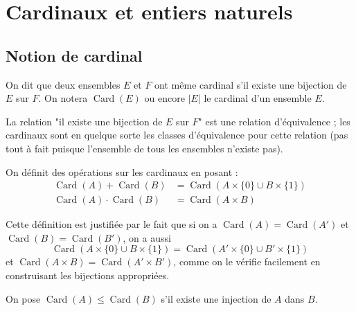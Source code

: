 \section{Cardinaux et entiers naturels}

\subsection{Notion de cardinal}

\begin{de}
On dit que deux ensembles $E$ et $F$ ont même cardinal s'il existe une bijection de $E$ sur $F$. On notera $\operatorname{Card}(E)$ ou encore $|E|$ le cardinal d'un ensemble $E$.
\end{de}

\begin{rem}
La relation "il existe une bijection de $E$ sur $F$" est une relation d'équivalence ; les cardinaux sont en quelque sorte les classes d'équivalence pour cette relation (pas tout à fait puisque l'ensemble de tous les ensembles n'existe pas).
\end{rem}

\begin{de}
On définit des opérations sur les cardinaux en posant :
\begin{align*}
\operatorname{Card}(A) + \operatorname{Card}(B) &= \operatorname{Card}(A \times \{0\} \cup B \times \{1\}) \\
\operatorname{Card}(A) \cdot \operatorname{Card}(B) &= \operatorname{Card}(A \times B)
\end{align*}
\end{de}

\begin{rem}
Cette définition est justifiée par le fait que si on a $\operatorname{Card}(A) = \operatorname{Card}(A')$ et $\operatorname{Card}(B) = \operatorname{Card}(B')$, on a aussi
\[ \operatorname{Card}(A \times \{0\} \cup B \times \{1\}) = \operatorname{Card}(A' \times \{0\} \cup B' \times \{1\}) \]
et $\operatorname{Card}(A \times B) = \operatorname{Card}(A' \times B')$, comme on le vérifie facilement en construisant les bijections appropriées.
\end{rem}

\begin{de}
On pose $\operatorname{Card}(A) \leq \operatorname{Card}(B)$ s'il existe une injection de $A$ dans $B$.
\end{de}

